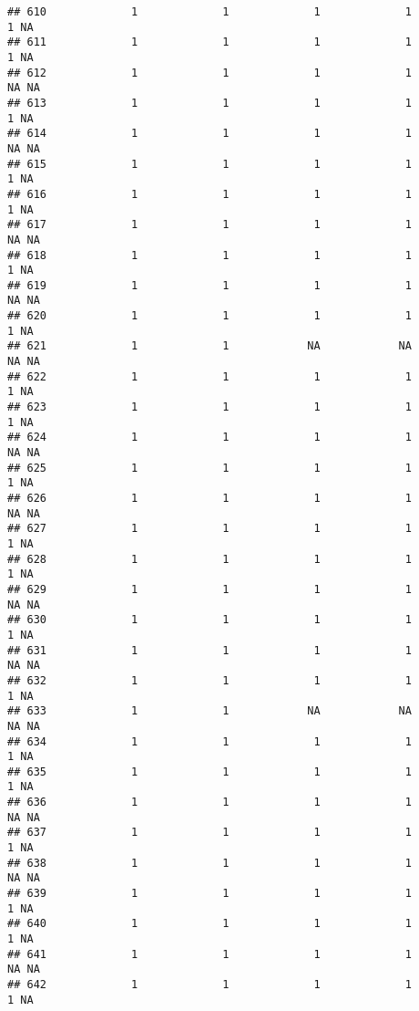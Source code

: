 \documentclass[
]{article}
\begin{document}
\begin{verbatim}
## 610             1             1             1             1             1 NA
## 611             1             1             1             1             1 NA
## 612             1             1             1             1            NA NA
## 613             1             1             1             1             1 NA
## 614             1             1             1             1            NA NA
## 615             1             1             1             1             1 NA
## 616             1             1             1             1             1 NA
## 617             1             1             1             1            NA NA
## 618             1             1             1             1             1 NA
## 619             1             1             1             1            NA NA
## 620             1             1             1             1             1 NA
## 621             1             1            NA            NA            NA NA
## 622             1             1             1             1             1 NA
## 623             1             1             1             1             1 NA
## 624             1             1             1             1            NA NA
## 625             1             1             1             1             1 NA
## 626             1             1             1             1            NA NA
## 627             1             1             1             1             1 NA
## 628             1             1             1             1             1 NA
## 629             1             1             1             1            NA NA
## 630             1             1             1             1             1 NA
## 631             1             1             1             1            NA NA
## 632             1             1             1             1             1 NA
## 633             1             1            NA            NA            NA NA
## 634             1             1             1             1             1 NA
## 635             1             1             1             1             1 NA
## 636             1             1             1             1            NA NA
## 637             1             1             1             1             1 NA
## 638             1             1             1             1            NA NA
## 639             1             1             1             1             1 NA
## 640             1             1             1             1             1 NA
## 641             1             1             1             1            NA NA
## 642             1             1             1             1             1 NA

\end{verbatim}
\end{document}
